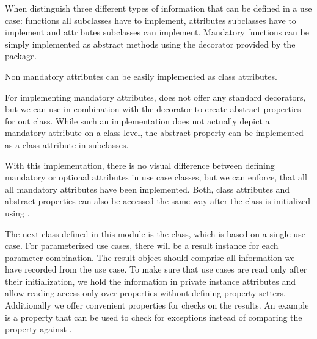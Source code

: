 

When distinguish three different types of information that can be
defined in a use case: functions all subclasses have to implement, attributes
subclasses have to implement and attributes subclasses can implement.
Mandatory functions can be simply implemented as abstract methods using the
 decorator provided by the
 package.



Non mandatory attributes can be easily implemented as class attributes.



For implementing mandatory attributes,  does not offer
any standard decorators, but we can use  in
combination with the  decorator to create
abstract properties for out class. While such an implementation does not
actually depict a mandatory attribute on a class level, the abstract property
can be implemented as a class attribute in subclasses.





With this implementation, there is no visual difference between defining
mandatory or optional attributes in use case classes, but we can enforce, that
all all mandatory attributes have been implemented. Both, class attributes and
abstract properties can also be accessed the same way after the class is
initialized using .

The next class defined in this module is the 
class, which is based on a single use case. For parameterized use cases, there
will be a result instance for each parameter combination. The result object
should comprise all information we have recorded from the use case. To make sure
that use cases are read only after their initialization, we hold the information
in private instance attributes and allow reading access only over properties
without defining property setters. Additionally we offer convenient properties
for checks on the results. An example is a  property
that can be used to check for exceptions instead of comparing the
 property against
.

